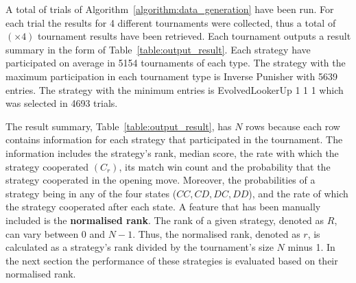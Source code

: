 \documentclass{article}
\newcommand{\uniquenumberofseeds}{}
\newcommand{\numberofalltournaments}{}
\begin{document}
A total of \uniquenumberofseeds trials of Algorithm~\ref{algorithm:data_generation} have been
run. For each trial the results for 4 different tournaments were collected,
thus a total of \numberofalltournaments $(\uniquenumberofseeds \times 4)$ tournament results have been
retrieved. Each tournament outputs a result summary in the form of
Table~\ref{table:output_result}. Each strategy have participated on average in
5154 tournaments of each type. The strategy with the maximum participation in each
tournament type is Inverse Punisher with 5639 entries. The strategy with the
minimum entries is EvolvedLookerUp 1 1 1 which was selected in 4693 trials.

The result summary, Table~\ref{table:output_result}, has \(N\) rows
because each row contains information for each strategy that participated in the
tournament. The information includes the strategy's rank, median score, the rate
with which the strategy cooperated $(C_r)$, its match win count and the
probability that the strategy cooperated in the opening move. Moreover, the
probabilities of a strategy being in any of the four states ($CC, CD, DC, DD$),
and the rate of which the strategy cooperated after each state. A feature that
has been manually included is the \textbf{normalised rank}. The rank of a given
strategy, denoted as \(R\), can vary between 0 and \(N-1\). Thus, the normalised rank,
denoted as $r$, is calculated as a strategy's rank divided by the tournament's
size $N$ minus 1. In the next section the performance of these strategies is evaluated
based on their normalised rank.
\end{document}
